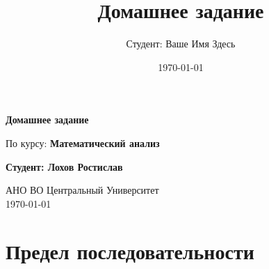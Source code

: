 \documentclass[a4paper,12pt]{article}
\title{Домашнее задание}
\author{Студент: Ваше Имя Здесь}
\date{\today}
\begin{document}
\begin{titlepage}
    \centering
    \vspace*{1cm}

    \Huge
    \textbf{Домашнее задание}

    \vspace{0.5cm}
    \LARGE
    По курсу: \textbf{Математический анализ}

    \vspace{1.5cm}

    \textbf{Студент: Лохов Ростислав}

    \vfill

    \Large
    АНО ВО Центральный Университет\\
    \vspace{0.3cm}
    \today

\end{titlepage}

\tableofcontents
\newpage

\section{Предел последовательности}
\end{document}
